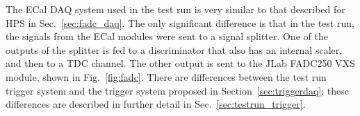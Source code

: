 The ECal DAQ system used in the test run is very similar to that described for HPS in Sec.~\ref{sec:fadc_daq}. 
The only significant difference is that in the test run, the signals from the ECal modules were sent to a signal splitter. One of the outputs of the splitter is fed to a 
discriminator that also has an internal scaler, and then to a TDC channel. The other output is sent to the 
JLab FADC250 VXS module, shown in Fig.~\ref{fig:fadc}.
There are differences between the test run trigger system and the trigger system proposed in Section~\ref{sec:triggerdaq}; these differences are described in further detail in Sec.~\ref{sec:testrun_trigger}.
